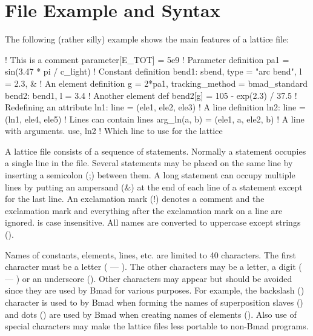 \section{File Example and Syntax}

The following (rather silly) example shows the main features of a
\bmad lattice file:
\begin{example}
  ! This is a comment
  parameter[E_TOT] = 5e9                   ! Parameter definition
  pa1 = sin(3.47 * pi / c_light)                 ! Constant definition
  bend1: sbend, type = "arc bend", l = 2.3, &    ! An element definition
      g = 2*pa1, tracking_method = bmad_standard
  bend2: bend1, l = 3.4                          ! Another element def
  bend2[g] = 105 - exp(2.3) / 37.5               ! Redefining an attribute
  ln1: line = (ele1, ele2, ele3)                 ! A line definition
  ln2: line = (ln1, ele4, ele5)                  ! Lines can contain lines
  arg_ln(a, b) = (ele1, a, ele2, b)              ! A line with arguments.
  use, ln2                                       ! Which line to use for the lattice
\end{example}

A \bmad lattice file consists of a sequence of statements. Normally a
statement occupies a single line in the file. Several statements may
be placed on the same line by inserting a semicolon (;) between
them. A long statement can occupy multiple lines by putting an
ampersand (\&) at the end of each line of a statement except for the
last line. An exclamation mark (!) denotes a comment and the
exclamation mark and everything after the exclamation mark on a line
are ignored.  \bmad is case insensitive. All names are converted to
uppercase except strings ().

Names of constants, elements, lines, etc. are limited to 40
characters. The first character must be a letter ( --- ).
The other characters may be a letter, a digit ( --- ) or
an underscore (\vn{_}). Other characters may appear but should be avoided
since they are used by Bmad for various purposes. For example, the 
backslash (\vn{\B}) character is used to by Bmad when forming the names of
superposition slaves () and dots () are used by Bmad 
when creating names of  elements (). Also use of
special characters may make the lattice files less portable to non-Bmad programs.

